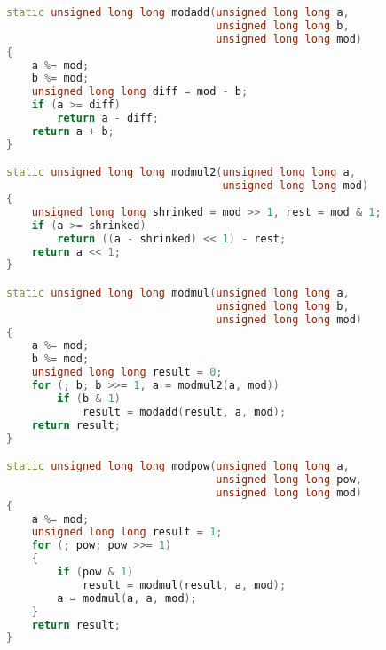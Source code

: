 \begin{lstlisting}[language=c++, caption={Класс, реализующий алгоритм RSA}]
static unsigned long long modadd(unsigned long long a,
                                 unsigned long long b,
                                 unsigned long long mod)
{
    a %= mod;
    b %= mod;
    unsigned long long diff = mod - b;
    if (a >= diff)
        return a - diff;
    return a + b;
}

static unsigned long long modmul2(unsigned long long a,
                                  unsigned long long mod)
{
    unsigned long long shrinked = mod >> 1, rest = mod & 1;
    if (a >= shrinked)
        return ((a - shrinked) << 1) - rest;
    return a << 1;
}

static unsigned long long modmul(unsigned long long a,
                                 unsigned long long b,
                                 unsigned long long mod)
{
    a %= mod;
    b %= mod;
    unsigned long long result = 0;
    for (; b; b >>= 1, a = modmul2(a, mod))
        if (b & 1)
            result = modadd(result, a, mod);
    return result;
}

static unsigned long long modpow(unsigned long long a,
                                 unsigned long long pow,
                                 unsigned long long mod)
{
    a %= mod;
    unsigned long long result = 1;
    for (; pow; pow >>= 1)
    {
        if (pow & 1)
            result = modmul(result, a, mod);
        a = modmul(a, a, mod);
    }
    return result;
}
\end{lstlisting}

